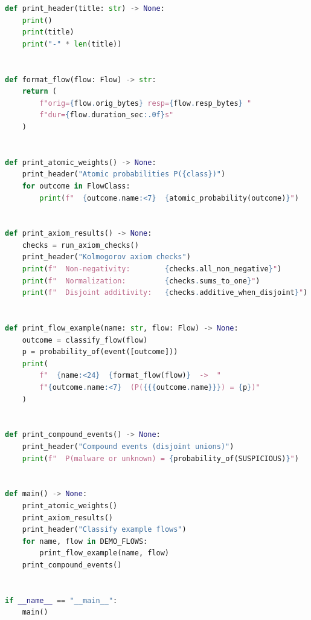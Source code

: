 \begin{lstlisting}[language=Python]
def print_header(title: str) -> None:
    print()
    print(title)
    print("-" * len(title))


def format_flow(flow: Flow) -> str:
    return (
        f"orig={flow.orig_bytes} resp={flow.resp_bytes} "
        f"dur={flow.duration_sec:.0f}s"
    )


def print_atomic_weights() -> None:
    print_header("Atomic probabilities P({class})")
    for outcome in FlowClass:
        print(f"  {outcome.name:<7}  {atomic_probability(outcome)}")


def print_axiom_results() -> None:
    checks = run_axiom_checks()
    print_header("Kolmogorov axiom checks")
    print(f"  Non-negativity:        {checks.all_non_negative}")
    print(f"  Normalization:         {checks.sums_to_one}")
    print(f"  Disjoint additivity:   {checks.additive_when_disjoint}")


def print_flow_example(name: str, flow: Flow) -> None:
    outcome = classify_flow(flow)
    p = probability_of(event([outcome]))
    print(
        f"  {name:<24}  {format_flow(flow)}  ->  "
        f"{outcome.name:<7}  (P({{{outcome.name}}}) = {p})"
    )


def print_compound_events() -> None:
    print_header("Compound events (disjoint unions)")
    print(f"  P(malware or unknown) = {probability_of(SUSPICIOUS)}")


def main() -> None:
    print_atomic_weights()
    print_axiom_results()
    print_header("Classify example flows")
    for name, flow in DEMO_FLOWS:
        print_flow_example(name, flow)
    print_compound_events()


if __name__ == "__main__":
    main()
\end{lstlisting}
